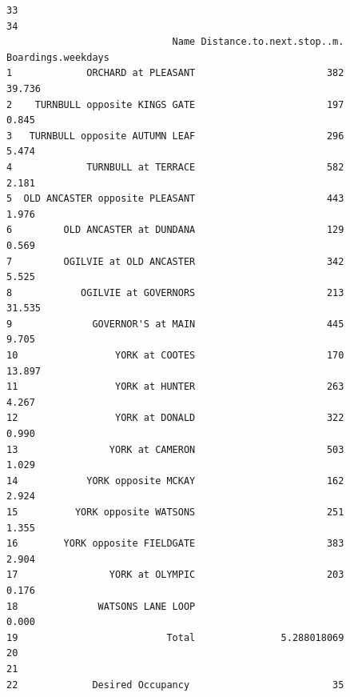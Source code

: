\documentclass[
11pt, %
oneside, %
english, %
singlespacing, %
]{macthesis} %
\begin{document}
\begin{verbatim}
33                                                                                                                                                                                                                                                                                                                                                                                                                               
34                                                                                                                                                                                                                                                                                                                                                                                                                               
                             Name Distance.to.next.stop..m. Boardings.weekdays
1             ORCHARD at PLEASANT                       382             39.736
2    TURNBULL opposite KINGS GATE                       197              0.845
3   TURNBULL opposite AUTUMN LEAF                       296              5.474
4             TURNBULL at TERRACE                       582              2.181
5  OLD ANCASTER opposite PLEASANT                       443              1.976
6         OLD ANCASTER at DUNDANA                       129              0.569
7         OGILVIE at OLD ANCASTER                       342              5.525
8            OGILVIE at GOVERNORS                       213             31.535
9              GOVERNOR'S at MAIN                       445              9.705
10                 YORK at COOTES                       170             13.897
11                 YORK at HUNTER                       263              4.267
12                 YORK at DONALD                       322              0.990
13                YORK at CAMERON                       503              1.029
14            YORK opposite MCKAY                       162              2.924
15          YORK opposite WATSONS                       251              1.355
16        YORK opposite FIELDGATE                       383              2.904
17                YORK at OLYMPIC                       203              0.176
18              WATSONS LANE LOOP                                        0.000
19                          Total               5.288018069                   
20                                                                            
21                                                                            
22             Desired Occupancy                         35                   

\end{verbatim}
\end{document}
